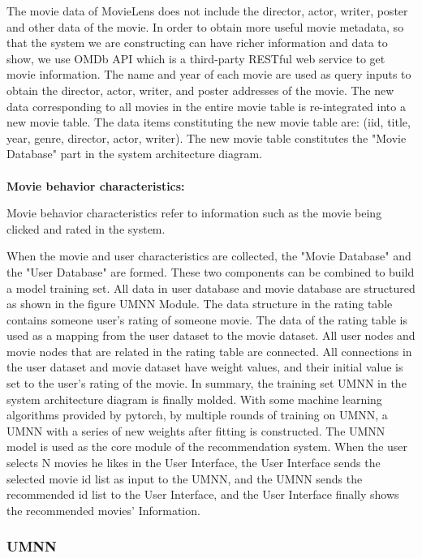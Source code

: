 \par The movie data of MovieLens does not include the director, actor, writer, poster and other data of the movie. In order to obtain more useful movie metadata, so that the system we are constructing can have richer information and data to show, we use OMDb API which is a third-party RESTful web service to get movie information. The name and year of each movie are used as query inputs to obtain the director, actor, writer, and poster addresses of the movie. The new data corresponding to all movies in the entire movie table is re-integrated into a new movie table. The data items constituting the new movie table are: (iid, title, year, genre, director, actor, writer). The new movie table constitutes the "Movie Database" part in the system architecture diagram.
\\
\\
\textbf{Movie behavior characteristics:}
\par Movie behavior characteristics refer to information such as the movie being clicked and rated in the system.
\par When the movie and user characteristics are collected, the "Movie Database" and the "User Database" are formed. These two components can be combined to build a model training set. All data in user database and movie database are structured as shown in the figure UMNN Module. The data structure in the rating table contains someone user's rating of someone movie. The data of the rating table is used as a mapping from the user dataset to the movie dataset. All user nodes and movie nodes that are related in the rating table are connected. All connections in the user dataset and movie dataset have weight values, and their initial value is set to the user's rating of the movie. In summary, the training set UMNN in the system architecture diagram is finally molded. With some machine learning algorithms provided by pytorch, by multiple rounds of training on UMNN, a UMNN with a series of new weights after fitting is constructed. The UMNN model is used as the core module of the recommendation system. When the user selects N movies he likes in the User Interface, the User Interface sends the selected movie id list as input to the UMNN, and the UMNN sends the recommended id list to the User Interface, and the User Interface finally shows the recommended movies' Information.

\subsubsection{UMNN}
